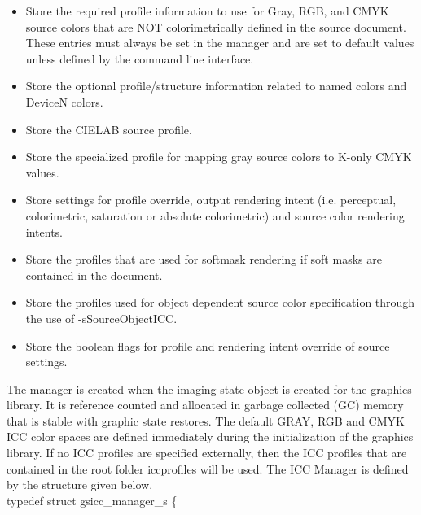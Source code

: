 \documentclass[12pt,notitlepage]{article}
\begin{document}
\begin{itemize}
\item Store the required profile information to use for Gray, RGB, and CMYK source colors that are NOT colorimetrically defined in the source document.  These entries must always be set in the manager and are set to default values unless defined by the command line interface.
\item Store the optional profile/structure information related to named colors and DeviceN colors.
\item Store the CIELAB source profile.
\item Store the specialized profile for mapping gray source colors to K-only CMYK values.
\item Store settings for profile override, output rendering intent (i.e. perceptual, colorimetric, saturation or absolute colorimetric) and source color rendering intents.
\item Store the profiles that are used for softmask rendering if soft masks are contained in the document.
\item Store the profiles used for object dependent source color specification through the use of -sSourceObjectICC.
\item Store the boolean flags for profile and rendering intent override of source settings.
\end{itemize}
The manager is created when the imaging state object is created for the graphics library.  It is reference counted and allocated in garbage collected (GC) memory that is stable with graphic state restores.  The default GRAY, RGB and CMYK ICC color spaces are defined immediately during the initialization of the graphics library.  If no ICC profiles are specified externally, then the ICC profiles that are contained in the root folder iccprofiles will be used.  The ICC Manager is defined by the structure given below.\\

\noindent typedef struct gsicc\_manager\_s \{
\end{document}
